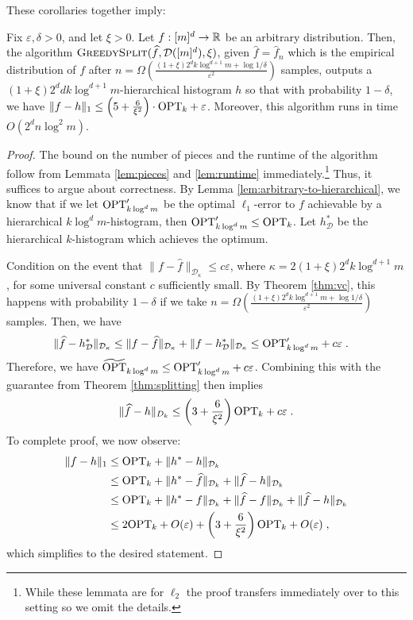 \documentclass[final,12pt]{colt2018} %
\newcommand{\eps}{\varepsilon}
\newcommand{\hier}{\mathcal{D}}
\newcommand{\fhat}{\widehat{f}}
\newcommand{\tOPT}{\widetilde{\OPT}}
\begin{document}
\noindent
These corollaries together imply:
\begin{corollary}
\label{cor:hierarchical-main}
Fix $\eps, \delta > 0$, and let $\xi > 0$.
Let $f: [m]^d \to \operatorname{\mathbb{R}}$ be an arbitrary distribution.
Then, the algorithm $\textsc{GreedySplit}(\fhat, \hier ([m]^d), \xi)$, given $\fhat = \fhat_n$ which is the empirical distribution of $f$ after
$
n = \Omega \left( \frac{(1 + \xi) 2^d k \log^{d + 1} m + \log 1 / \delta}{\eps^2} \right)
$
samples, outputs a $(1 + \xi) 2^d d k \log^{d  +1} m$-hierarchical histogram $h$ so that with probability $1 - \delta$, we have
$
\| f - h \|_1 \leq \left( 5 + \frac{6}{\xi^2} \right) \cdot \OPT_k + \eps$.
Moreover, this algorithm runs in time $O(2^d n \log^2 m)$.
\end{corollary}
\begin{proof}
The bound on the number of pieces and the runtime of the algorithm follow from Lemmata \ref{lem:pieces} and \ref{lem:runtime} immediately.\footnote{While these lemmata are for $\ell_2$ the proof transfers immediately over to this setting so we omit the details.}
Thus, it suffices to argue about correctness.
By Lemma \ref{lem:arbitrary-to-hierarchical}, we know that if we let $\mathrm{OPT}'_{k \log^d m}$ 
be the optimal $\ell_1$-error to $f$ achievable by a hierarchical $k \log^d m$-histogram, 
then $\mathrm{OPT}'_{k \log^d m} \leq \mathrm{OPT}_k$.
Let $h^*_{\hier}$ be the hierarchical $k$-histogram which achieves the optimum.

Condition on the event that 
$\| f - \fhat \|_{\hier_\kappa} \leq c \eps$,
where $\kappa = 2 (1 + \xi) 2^d k \log^{d + 1} m$, for some universal constant $c$ sufficiently small.
By Theorem \ref{thm:vc}, this happens with probability $1 - \delta$ if we take 
$
n = \Omega \left( \frac{(1 + \xi) 2^d k \log^{d + 1} m + \log 1 / \delta}{\eps^2} \right)
$
samples.
Then, we have
\begin{align*}
\| \fhat - h^*_\hier \|_{\hier_\kappa} &\leq \| f - \fhat \|_{\hier_\kappa} + \| f - h^*_\hier \|_{\hier_\kappa} \leq \OPT'_{k \log^d m} + c \eps \; .
\end{align*}
Therefore, we have $\tOPT_{k \log^d m} \leq \OPT'_{k \log^d m} + c \eps$.
Combining this with the guarantee from Theorem \ref{thm:splitting} then implies
\[
\|\fhat - h\|_{D_k} \leq \left( 3 + \frac{6}{\xi^2} \right) \OPT_k + c \eps \; .
\]
To complete proof, we now observe:
\begin{align*}
\|f - h\|_1 & \leq \OPT_k + \|h^* -h \|_{\hier_k} \\
                 &\leq \OPT_k + \|h^* - \fhat \|_{\hier_k} + \|\fhat - h \|_{\hier_k} \\
	   &\leq \OPT_k + \|h^* - f \|_{\hier_k} + \| \fhat - f \|_{\hier_k} + \|\fhat - h \|_{\hier_k} \\
	  &\leq 2\OPT_k + O(\eps) + \left( 3 + \frac{6}{\xi^2} \right) \OPT_k + O(\eps) \; ,
\end{align*}
which simplifies to the desired statement.
\end{proof}
\end{document}
